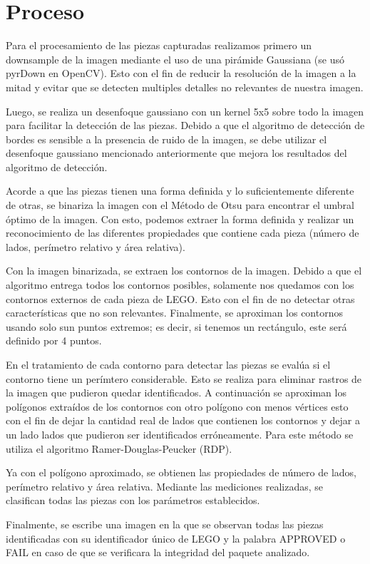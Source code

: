 \documentclass[letterpaper]{scrreprt}
\begin{document}

\chapter{Proceso}

Para el procesamiento de las piezas capturadas realizamos primero un downsample de la imagen mediante el uso de una pirámide Gaussiana (se usó pyrDown en OpenCV). Esto con el fin de reducir la resolución de la imagen a la mitad y evitar que se detecten multiples detalles no relevantes de nuestra imagen.

Luego, se realiza un desenfoque gaussiano con un kernel 5x5 sobre todo la imagen para facilitar la detección de las piezas. Debido a que el algoritmo de detección de bordes es sensible a la presencia de ruido de la imagen, se debe utilizar el desenfoque gaussiano mencionado anteriormente que mejora los resultados del algoritmo de detección.

Acorde a que las piezas tienen una forma definida y lo suficientemente diferente de otras, se binariza la imagen con el Método de Otsu para encontrar el umbral óptimo de la imagen. Con esto, podemos extraer la forma definida y realizar un reconocimiento de las diferentes propiedades que contiene cada pieza (número de lados, perímetro relativo y área relativa).

Con la imagen binarizada, se extraen los contornos de la imagen. Debido a que el algoritmo entrega todos los contornos posibles, solamente nos quedamos con los contornos externos de cada pieza de LEGO. Esto con el fin de no detectar otras características que no son relevantes. Finalmente, se aproximan los contornos usando solo sun puntos extremos; es decir, si tenemos un rectángulo, este será definido por 4 puntos.

En el tratamiento de cada contorno para detectar las piezas se evalúa si el contorno tiene un perímtero considerable. Esto se realiza para eliminar rastros de la imagen que pudieron quedar identificados. A continuación se aproximan los polígonos extraídos de los contornos con otro polígono con menos vértices esto con el fin de dejar la cantidad real de lados que contienen los contornos y dejar a un lado lados que pudieron ser identificados erróneamente. Para este método se utiliza el algoritmo Ramer-Douglas-Peucker (RDP).

Ya con el polígono aproximado, se obtienen las propiedades de número de lados, perímetro relativo y área relativa. Mediante las mediciones realizadas, se clasifican todas las piezas con los parámetros establecidos.

Finalmente, se escribe una imagen en la que se observan todas las piezas identificadas con su identificador único de LEGO y la palabra APPROVED o FAIL en caso de que se verificara la integridad del paquete analizado.




%
%
\end{document}
